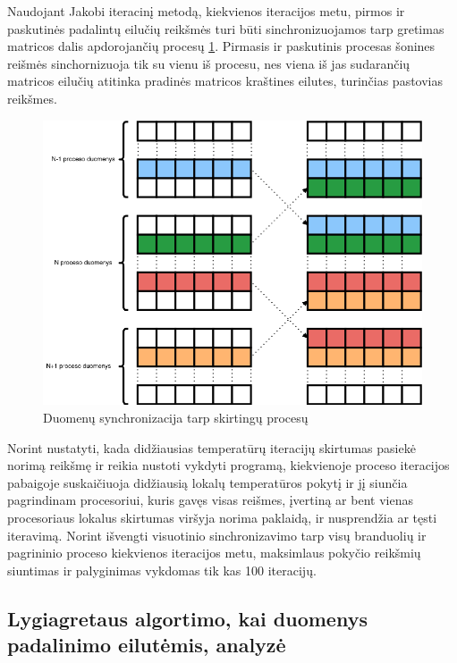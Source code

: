 \documentclass{VUMIFPSbakalaurinis}
\begin{document}
Naudojant Jakobi iteracinį metodą, kiekvienos iteracijos metu, pirmos ir paskutinės padalintų eilučių reikšmės turi būti sinchronizuojamos tarp gretimas matricos dalis apdorojančių procesų \ref{img:sync}. 
Pirmasis ir paskutinis procesas šonines reišmės sinchornizuoja tik su vienu iš procesu, nes viena iš jas sudarančių matricos eilučių atitinka pradinės matricos kraštines eilutes, turinčias pastovias reikšmes.

\begin{figure}[H]
    \centering
    \includegraphics[scale=0.5]{img/sync.png}
    \caption{Duomenų synchronizacija tarp skirtingų procesų}
    \label{img:sync}
\end{figure}

Norint nustatyti, kada didžiausias temperatūrų iteracijų skirtumas pasiekė norimą reikšmę ir reikia nustoti vykdyti programą, kiekvienoje proceso iteracijos pabaigoje suskaičiuoja didžiausią lokalų temperatūros pokytį ir jį siunčia pagrindinam procesoriui, 
kuris gavęs visas reišmes, įvertiną ar bent vienas procesoriaus lokalus skirtumas viršyja norima paklaidą, ir nusprendžia ar tęsti iteravimą.
Norint išvengti visuotinio sinchronizavimo tarp visų branduolių ir pagrininio proceso kiekvienos iteracijos metu, maksimlaus pokyčio reikšmių siuntimas ir palyginimas vykdomas tik kas 100 iteracijų.

\subsection{Lygiagretaus algortimo, kai duomenys padalinimo eilutėmis, analyzė}
\end{document}
